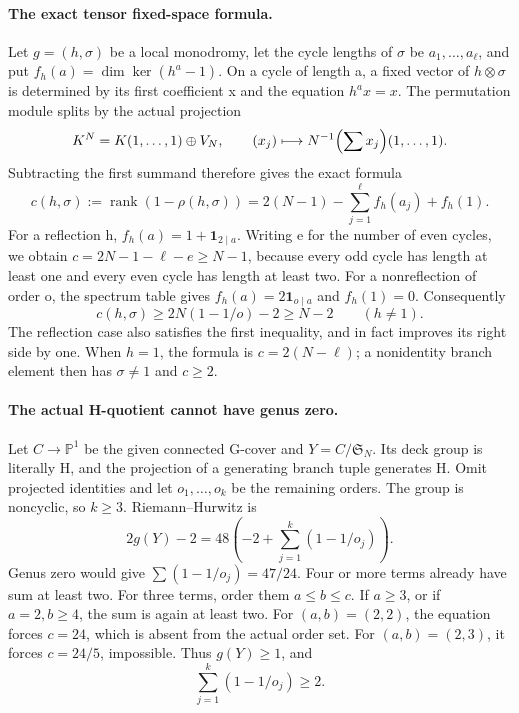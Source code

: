\paragraph{The exact tensor fixed-space formula.}
Let \(g=(h,\sigma)\) be a local monodromy, let the cycle lengths
of \(\sigma\) be \(a_1,\ldots,a_\ell\), and put
\(f_h(a)=\dim\ker(h^a-1)\). On a cycle of length a, a fixed
vector of \(h\otimes\sigma\) is determined by its first
coefficient x and the equation \(h^a x=x\). The permutation
module splits by the actual projection
\[
 K^N=K(1,\ldots,1)\oplus V_N,\qquad
 (x_j)\longmapsto N^{-1}\Bigl(\sum x_j\Bigr)(1,\ldots,1).
\]
Subtracting the first summand therefore gives the exact formula
\begin{equation}\label{eq:S29-codimension}
 c(h,\sigma):=\operatorname{rank}(1-\rho(h,\sigma))
 =2(N-1)-\sum_{j=1}^{\ell}f_h(a_j)+f_h(1).
\end{equation}
For a reflection h, \(f_h(a)=1+\mathbf1_{2\mid a}\).
Writing e for the number of even cycles, we obtain
\(c=2N-1-\ell-e\ge N-1\), because every odd cycle has
length at least one and every even cycle has length at least two.
For a nonreflection of order o, the spectrum table gives
\(f_h(a)=2\mathbf1_{o\mid a}\) and \(f_h(1)=0\).
Consequently
\[
 c(h,\sigma)\ge2N(1-1/o)-2\ge N-2\qquad(h\ne1).
\]
The reflection case also satisfies the first inequality, and in fact
improves its right side by one. When \(h=1\), the formula is
\(c=2(N-\ell)\); a nonidentity branch element then has
\(\sigma\ne1\) and \(c\ge2\).

\paragraph{The actual H-quotient cannot have genus zero.}
Let \(C\to\mathbb P^1\) be the given connected G-cover and
\(Y=C/\mathfrak S_N\). Its deck group is literally H, and the
projection of a generating branch tuple generates H. Omit projected
identities and let \(o_1,\ldots,o_k\) be the remaining orders.
The group is noncyclic, so \(k\ge3\). Riemann--Hurwitz is
\[
 2g(Y)-2=48\left(-2+\sum_{j=1}^k(1-1/o_j)\right).
\]
Genus zero would give \(\sum(1-1/o_j)=47/24\). Four or
more terms already have sum at least two. For three terms, order them
\(a\le b\le c\). If \(a\ge3\), or if \(a=2,b\ge4\),
the sum is again at least two. For \((a,b)=(2,2)\), the equation
forces \(c=24\), which is absent from the actual order set.
For \((a,b)=(2,3)\), it forces \(c=24/5\), impossible.
Thus \(g(Y)\ge1\), and
\begin{equation}\label{eq:S29-RH}
                  \sum_{j=1}^k(1-1/o_j)\ge2.
\end{equation}

